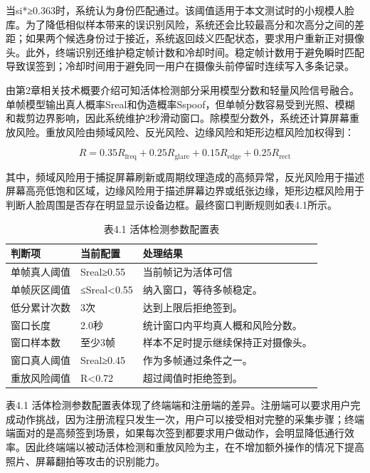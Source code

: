 \documentclass[UTF8]{heuthesis}
\begin{document}
当si*≥0.363时，系统认为身份匹配通过。该阈值适用于本文测试时的小规模人脸库。为了降低相似样本带来的误识别风险，系统还会比较最高分和次高分之间的差距；如果两个候选身份过于接近，系统返回歧义匹配状态，要求用户重新正对摄像头。此外，终端识别还维护稳定帧计数和冷却时间。稳定帧计数用于避免瞬时匹配导致误签到；冷却时间用于避免同一用户在摄像头前停留时连续写入多条记录。

由第2章相关技术概要介绍可知活体检测部分采用模型分数和轻量风险信号融合。单帧模型输出真人概率Sreal和伪造概率Sspoof，但单帧分数容易受到光照、模糊和裁剪边界影响，因此系统维护2秒滑动窗口。除模型分数外，系统还计算屏幕重放风险。重放风险由频域风险、反光风险、边缘风险和矩形边框风险加权得到：

\begin{equation*}
R=0.35R_{\mathrm{freq}}+0.25R_{\mathrm{glare}}+0.15R_{\mathrm{edge}}+0.25R_{\mathrm{rect}}\tag{4.4}
\end{equation*}

其中，频域风险用于捕捉屏幕刷新或周期纹理造成的高频异常，反光风险用于描述屏幕高亮低饱和区域，边缘风险用于描述屏幕边界或纸张边缘，矩形边框风险用于判断人脸周围是否存在明显显示设备边框。最终窗口判断规则如表4.1所示。

\begingroup
\small
\begin{longtable}{|>{\raggedright\arraybackslash}p{}|>{\raggedright\arraybackslash}p{}|>{\raggedright\arraybackslash}p{}|}
\caption{表4.1 活体检测参数配置表}\\
\hline
判断项 & 当前配置 & 处理结果 \\
\hline
单帧真人阈值 & Sreal≥0.55 & 当前帧记为活体可信 \\
\hline
单帧灰区阈值 & 0.30≤Sreal\textless{}0.55 & 纳入窗口，等待多帧稳定。 \\
\hline
低分累计次数 & 3次 & 达到上限后拒绝签到。 \\
\hline
窗口长度 & 2.0秒 & 统计窗口内平均真人概和风险分数。 \\
\hline
窗口样本数 & 至少3帧 & 样本不足时提示继续保持正对摄像头。 \\
\hline
窗口真人阈值 & Sreal≥0.45 & 作为多帧通过条件之一。 \\
\hline
重放风险阈值 & R\textless{}0.72 & 超过阈值时拒绝签到。 \\
\hline
\end{longtable}
\endgroup

表4.1 活体检测参数配置表体现了终端端和注册端的差异。注册端可以要求用户完成动作挑战，因为注册流程只发生一次，用户可以接受相对完整的采集步骤；终端端面对的是高频签到场景，如果每次签到都要求用户做动作，会明显降低通行效率。因此终端端以被动活体检测和重放风险为主，在不增加额外操作的情况下提高照片、屏幕翻拍等攻击的识别能力。
\end{document}
